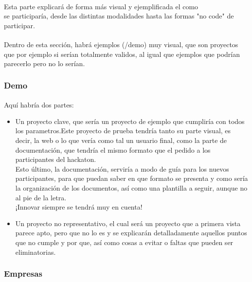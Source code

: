 \documentclass[a4paper]{article}
\begin{document}
    \paragraph{}
    Esta parte explicará de forma más visual y ejemplificada el como\\ se participaría, 
    desde las distintas modalidades hasta las formas "no code" de participar.
    \paragraph{}
    Dentro de esta sección, habrá ejemplos (/demo) muy visual, que son proyectos que por ejemplo 
    si serían totalmente validos, al igual que ejemplos que podrían parecerlo pero no lo serían.
    \subsubsection[/demo]{Demo}
    \paragraph{}
    Aquí habría dos partes: 
    \begin{itemize}
        \item 
        Un proyecto clave, que sería un proyecto de ejemplo que cumpliría con 
        todos los parametros.Este proyecto de prueba tendría tanto su parte visual, es decir, 
        la web o lo que vería como tal un usuario final, como la parte de documentación, 
        que tendría el mismo formato que el pedido a los participantes del hackaton.\\
        Esto último, la documentación, serviría a modo de guía para los nuevos participantes, 
        para que puedan saber en que formato se presenta y como sería la organización de los 
        documentos, así como una plantilla a seguir, aunque no al pie de la letra.\\
        ¡Innovar siempre se tendrá muy en cuenta!
        \item Un proyecto no representativo, el cual 
        será un proyecto que a primera vista parece apto, pero que no lo es y 
        se explicarán detalladamente aquellos puntos que no cumple y por que, así como
        cosas a evitar o faltas que pueden ser eliminatorias.
    \end{itemize}
    \subsubsection[/empresas]{Empresas}
\end{document}
